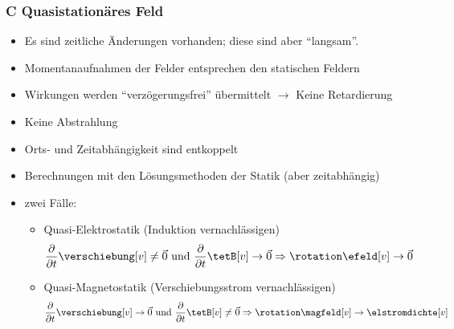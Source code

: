 \begin{frame}
  \frametitle{C Quasistationäres Feld}

  \begin{itemize}[<+->]
    \item Es sind zeitliche Änderungen vorhanden; diese sind aber
      \enquote{langsam}.
      \item Momentanaufnahmen der Felder entsprechen den statischen
        Feldern
        \item Wirkungen werden \enquote{verzögerungsfrei} übermittelt
          $\to$ Keine \alert{Retardierung}
        \item Keine Abstrahlung
        \item Orts- und Zeitabhängigkeit sind entkoppelt
          \item Berechnungen mit den Lösungsmethoden der Statik (aber zeitabhängig)
          \item zwei Fälle:
            \begin{itemize}[<+->]
            \item Quasi-Elektrostatik (Induktion vernachlässigen)
              $$
              \dfrac{\partial}{\partial t} \verschiebung[v] \neq \vec{0}
              \text{ und } \dfrac{\partial}{\partial t} \tetB[v] \to \vec{0}
              \Rightarrow \rotation\efeld[v] \to \vec{0}
              $$
              \item Quasi-Magnetostatik (Verschiebungsstrom vernachlässigen)
              $$
              \dfrac{\partial}{\partial t} \verschiebung[v] \to \vec{0}
              \text{ und } \dfrac{\partial}{\partial t} \tetB[v] \neq \vec{0}
              \Rightarrow \rotation\magfeld[v] \to \elstromdichte[v]
              $$
              \end{itemize}

    \end{itemize}
\end{frame}

